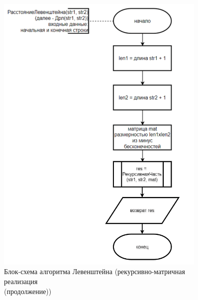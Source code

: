 \begin{figure}[H]
    \centering
    \includegraphics[width=0.9\textwidth]{img/block_1_3_2.png}
    \caption{Блок-схема алгоритма Левенштейна (рекурсивно-матричная реализация\\(продолжение))}
    \label{fig:block_1_3_2}
\end{figure}

